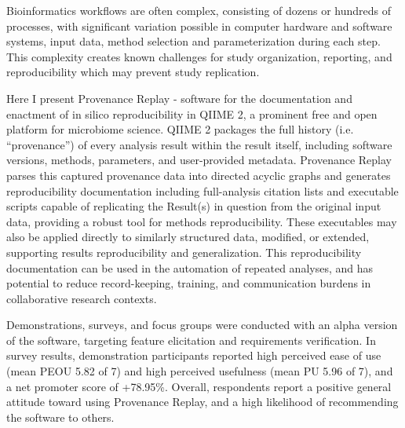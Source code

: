 Bioinformatics workflows are often complex, consisting of dozens or hundreds of
processes, with significant variation possible in computer hardware and software
systems, input data, method selection and parameterization during each step.
This complexity creates known challenges for study organization, reporting, and
reproducibility which may prevent study replication.

Here I present Provenance Replay - software for the documentation and enactment
of in silico reproducibility in QIIME 2, a prominent free and open platform for
microbiome science. QIIME 2 packages the full history (i.e. “provenance”) of
every analysis result within the result itself, including software versions,
methods, parameters, and user-provided metadata. Provenance Replay parses this
captured provenance data into directed acyclic graphs and generates
reproducibility documentation including full-analysis citation lists and
executable scripts capable of replicating the Result(s) in question from the
original input data, providing a robust tool for methods reproducibility. These
executables may also be applied directly to similarly structured data, modified,
or extended, supporting results reproducibility and generalization. This
reproducibility documentation can be used in the automation of repeated
analyses, and has potential to reduce record-keeping, training, and
communication burdens in collaborative research contexts.

Demonstrations, surveys, and focus groups were conducted with an alpha version
of the software, targeting feature elicitation and requirements verification.
In survey results, demonstration participants reported high perceived ease of
use (mean PEOU 5.82 of 7) and high perceived usefulness (mean PU 5.96 of 7), and
a net promoter score of +78.95\%. Overall, respondents report a positive general
attitude toward using Provenance Replay, and a high likelihood of recommending
the software to others.
